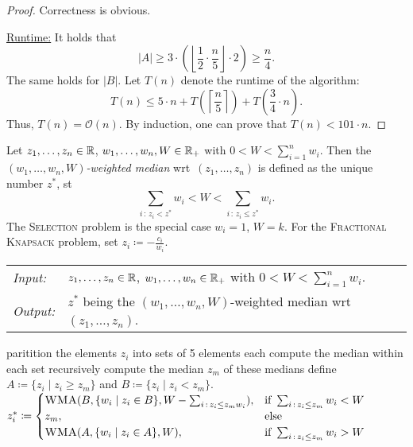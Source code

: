 \documentclass[../skript.tex]{subfiles}
\begin{document}
\vspace{-7pt}
\EndAlgorithmLine
\begin{proof}
Correctness is obvious.

\underline{Runtime:} It holds that
\[
	|A| \geq 3 \cdot \left( \left\lfloor \frac{1}{2} \cdot \frac{n}{5} \right\rfloor \cdot 2 \right) \geq \frac{n}{4}.
\]
The same holds for $|B|$.
Let $T(n)$ denote the runtime of the algorithm:
\[
	T(n) \leq 5 \cdot n + T \left( \left\lceil \frac{n}{5} \right\rceil \right) + T \left( \frac{3}{4} \cdot n \right).
\]
Thus, $T(n) = \mathcal{O}(n)$. By induction, one can prove that $T(n) < 101 \cdot n$.
\end{proof}
Let $z_1, \ldots, z_n \in \mathbb{R}$, $w_1, \ldots, w_n, W \in \mathbb{R}_+$ with $0 < W < \sum_{i=1}^n w_i$.
Then the \linebreak \emph{$(w_1, \ldots, w_n, W)$-weighted median} \ac{wrt}\ $(z_1, \ldots, z_n)$ is defined as the unique number $z^*$, \ac{st}
\[
	\sum_{i \,:\, z_i < z^*} w_i < W < \sum_{i \,:\, z_i \leq z^*} w_i.
\]
The \textsc{Selection} problem is the special case $w_i = 1$, $W = k$.
For the \textsc{Fractional Knapsack} problem, set $z_i \coloneqq - \frac{c_i}{w_i}$.
\begin{algorithmbox}
\begin{tabular}{@{}ll}
\textit{Input:} & $z_1, \ldots, z_n \in \mathbb{R}$, $w_1, \ldots, w_n \in \mathbb{R}_+$ with $0 < W < \sum_{i=1}^n w_i$. \\
\textit{Output:} & $z^*$ being the $(w_1, \ldots, w_n, W)$-weighted median \ac{wrt}\ $(z_1, \ldots, z_n)$.
\end{tabular}
\end{algorithmbox}
\vspace{-7pt}
\begin{algorithm}[H]
paritition the elements $z_i$ into sets of 5 elements each\;
compute the median within each set\;
recursively compute the median $z_m$ of these medians\;
define $A \coloneq \{ z_i \mid z_i \geq z_m \}$ and $B \coloneqq \{ z_i \mid z_i < z_m \}$.\;
$z_i^* \coloneqq \begin{cases}
\textsc{WMA}(B, \{ w_i \mid z_i \in B \}, W - \sum_{i \,:\, z_i \leq z_m w_i}), & \text{if } \sum_{i \,:\, z_i \leq z_m} w_i < W \\
z_m, & \text{else} \\
\textsc{WMA}(A, \{ w_i \mid z_i \in A \}, W), & \text{if } \sum_{i \,:\, z_i \leq z_m} w_i > W
\end{cases}$\;
\end{algorithm}
\vspace{-7pt}
\end{document}
